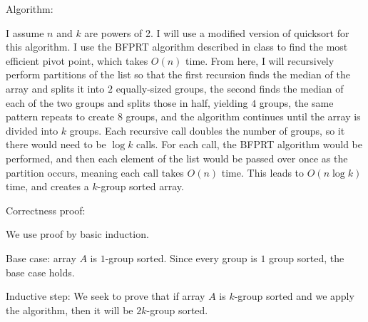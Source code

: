 \documentclass[11pt]{article}
\begin{document}
\bigbreak

Algorithm:

I assume $n$ and $k$ are powers of 2. 
I will use a modified version of quicksort for this algorithm. I use the BFPRT algorithm described in class to find the most efficient pivot point, which takes $O(n)$ time. 
From here, I will recursively perform partitions of the list so that the first recursion finds the median of the array and splits it into $2$ equally-sized groups, 
the second finds the median of each of the two groups and splits those in half, yielding $4$ groups, 
the same pattern repeats to create $8$ groups, and the algorithm continues until the array is divided into $k$ groups. 
Each recursive call doubles the number of groups, so it there would need to be $\log k$ calls. 
For each call, the BFPRT algorithm would be performed, and then 
each element of the list would be passed over once as the partition occurs, 
meaning each call takes $O(n)$ time. 
This leads to $O(n \log k)$ time, and creates a $k$-group sorted array.

\bigbreak

Correctness proof:

We use proof by basic induction.

Base case: array $A$ is $1$-group sorted. Since every group is $1$ group sorted, the base case holds.

Inductive step: We seek to prove that if array $A$ is $k$-group sorted and we apply the algorithm, then it will be $2k$-group sorted.
\end{document}
